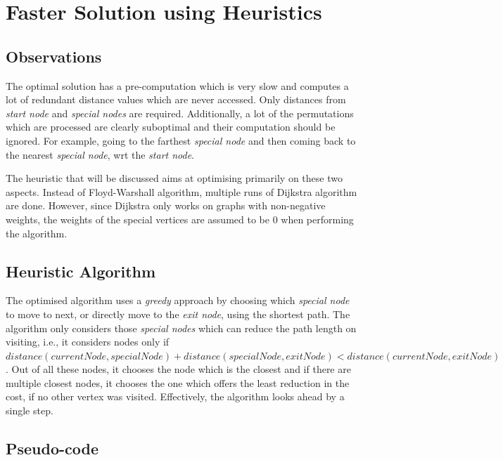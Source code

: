 \documentclass[12pt]{report}
\begin{document}
\chapter{Faster Solution using Heuristics}

\section{Observations}
The optimal solution has a pre-computation which is very slow and computes a lot of redundant distance values which are never accessed. Only distances from \textit{start node} and \textit{special nodes} are required. Additionally, a lot of the permutations which are processed are clearly suboptimal and their computation should be ignored. For example, going to the farthest \textit{special node} and then coming back to the nearest \textit{special node}, wrt the \textit{start node}.\par
The heuristic that will be discussed aims at optimising primarily on these two aspects. Instead of Floyd-Warshall algorithm, multiple runs of Dijkstra algorithm are done. However, since Dijkstra only works on graphs with non-negative weights, the weights of the special vertices are assumed to be $0$ when performing the algorithm.

\section{Heuristic Algorithm}
The optimised algorithm uses a \textit{greedy} approach by choosing which \textit{special node} to move to next, or directly move to the \textit{exit node}, using the shortest path. The algorithm only considers those \textit{special nodes} which can reduce the path length on visiting, i.e., it considers nodes only if ${distance}({currentNode}, {specialNode}) + {distance}({specialNode}, {exitNode}) < {distance}({currentNode}, {exitNode})$. Out of all these nodes, it chooses the node which is the closest and if there are multiple closest nodes, it chooses the one which offers the least reduction in the cost, if no other vertex was visited. Effectively, the algorithm looks ahead by a single step.

\section{Pseudo-code}
\end{document}
